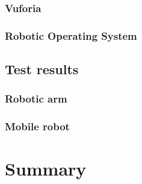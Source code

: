 \documentclass[printmode,en]{mgr}
\begin{document}
\subsection{Vuforia}

\subsection{Robotic Operating System}

\section{Test results}

\subsection{Robotic arm}

\subsection{Mobile robot}


\chapter{Summary}
\appendix




\end{document}
